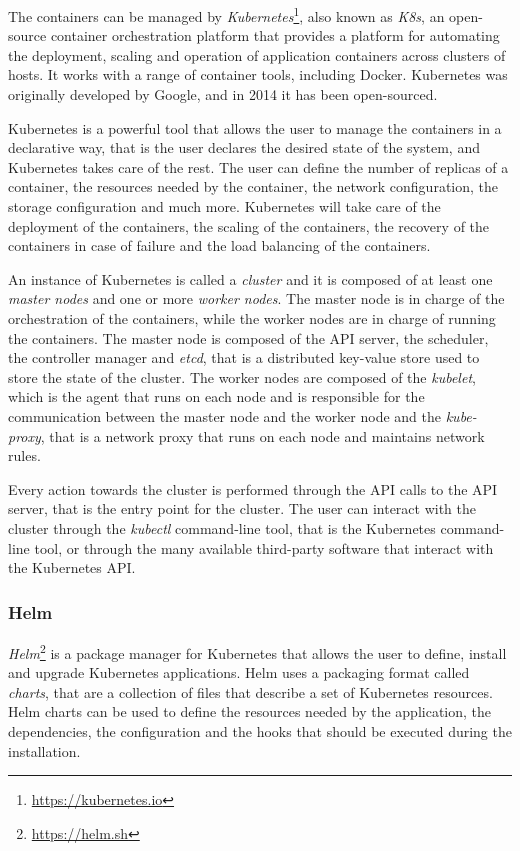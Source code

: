 The containers can be managed by \textit{Kubernetes}\footnote{\url{https://kubernetes.io}}, also known as \textit{K8s}, an open-source container orchestration platform that provides a platform for automating the deployment, scaling and operation of application containers across clusters of hosts. It works with a range of container tools, including Docker. Kubernetes was originally developed by Google, and in 2014 it has been open-sourced.~\cite{kubernetes-overview}

Kubernetes is a powerful tool that allows the user to manage the containers in a declarative way, that is the user declares the desired state of the system, and Kubernetes takes care of the rest. The user can define the number of replicas of a container, the resources needed by the container, the network configuration, the storage configuration and much more. Kubernetes will take care of the deployment of the containers, the scaling of the containers, the recovery of the containers in case of failure and the load balancing of the containers.

An instance of Kubernetes is called a \textit{cluster} and it is composed of at least one \textit{master nodes} and one or more \textit{worker nodes}. The master node is in charge of the orchestration of the containers, while the worker nodes are in charge of running the containers. The master node is composed of the API server, the scheduler, the controller manager and \textit{etcd}, that is a distributed key-value store used to store the state of the cluster. The worker nodes are composed of the \textit{kubelet}, which is the agent that runs on each node and is responsible for the communication between the master node and the worker node and the \textit{kube-proxy}, that is a network proxy that runs on each node and maintains network rules.

Every action towards the cluster is performed through the API calls to the API server, that is the entry point for the cluster. The user can interact with the cluster through the \textit{kubectl} command-line tool, that is the Kubernetes command-line tool, or through the many available third-party software that interact with the Kubernetes API.

\subsubsection{Helm}

\textit{Helm}\footnote{\url{https://helm.sh}} is a package manager for Kubernetes that allows the user to define, install and upgrade Kubernetes applications. Helm uses a packaging format called \textit{charts}, that are a collection of files that describe a set of Kubernetes resources. Helm charts can be used to define the resources needed by the application, the dependencies, the configuration and the hooks that should be executed during the installation.

